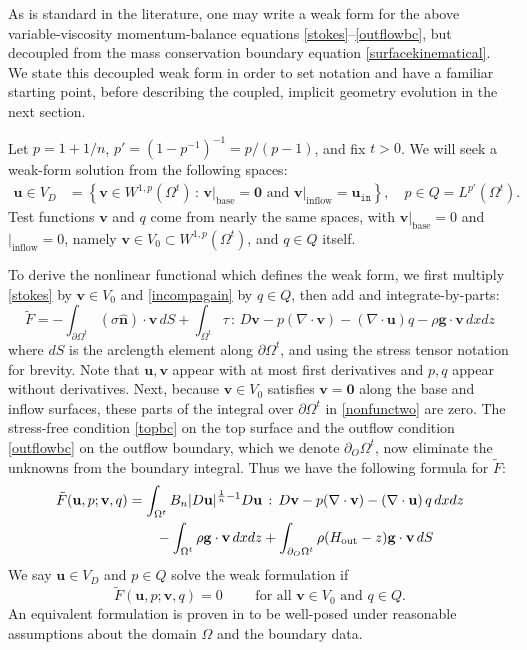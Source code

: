 \documentclass[letterpaper,final,12pt,reqno]{amsart}
\newcommand{\hbn}{\hat{\mathbf{n}}}
\newcommand{\bg}{\mathbf{g}}
\newcommand{\bu}{\mathbf{u}}
\newcommand{\bv}{\mathbf{v}}
\newcommand{\bzero}{\bm{0}}
\begin{document}
As is standard in the literature, one may write a weak form for the above variable-viscosity momentum-balance equations \eqref{stokes}--\eqref{outflowbc}, but decoupled from the mass conservation boundary equation \eqref{surfacekinematical}.  We state this decoupled weak form in order to set notation and have a familiar starting point, before describing the coupled, implicit geometry evolution in the next section.

Let $p=1+1/n$, $p'=(1-p^{-1})^{-1}=p/(p-1)$, and fix $t>0$.  We will seek a weak-form solution from the following spaces:
\begin{align*}
\bu \in V_D &= \left\{\bv \in W^{1,p}(\Omega^t)\,:\,\bv\big|_{\text{base}}=\bzero \text{ and } \bv\big|_{\text{inflow}} = \bu_{\texttt{in}}\right\}, \quad p \in Q =L^{p'}(\Omega^t).
\end{align*}
Test functions $\bv$ and $q$ come from nearly the same spaces, with $\bv\big|_{\text{base}} =0$ and $\big|_{\text{inflow}} = 0$, namely $\bv \in V_0 \subset W^{1,p}(\Omega^t)$, and $q \in Q$ itself.

To derive the nonlinear functional which defines the weak form, we first multiply \eqref{stokes} by $\bv\in V_0$ and \eqref{incompagain} by $q\in Q$, then add and integrate-by-parts:
\begin{equation}
\tilde F = -\int_{\partial\Omega^t} (\sigma \hbn)\cdot \bv\,dS + \int_{\Omega^t} \tau \,:\,D\bv - p (\nabla \cdot \bv) - \left(\nabla \cdot \bu\right) q - \rho \mathbf{g} \cdot \bv \,dx dz \label{nonfunctwo}
\end{equation}
where $dS$ is the arclength element along $\partial\Omega^t$, and using the stress tensor notation for brevity.  Note that $\bu,\bv$ appear with at most first derivatives and $p,q$ appear without derivatives.  Next, because $\bv\in V_0$ satisfies $\bv=\bzero$ along the base and inflow surfaces, these parts of the integral over $\partial\Omega^t$ in \eqref{nonfunctwo} are zero.  The stress-free condition \eqref{topbc} on the top surface and the outflow condition \eqref{outflowbc} on the outflow boundary, which we denote $\partial_O \Omega^t$, now eliminate the unknowns from the boundary integral.  Thus we have the following formula for $\tilde F$:
\begin{align}
\tilde F(\bu,p;\bv,q) &= \int_{\Omega^t} B_n |D\bu|^{\frac{1}{n} - 1} D\bu\,:\,D\bv - p (\nabla \cdot \bv) - \left(\nabla \cdot \bu\right) q \,dx dz \label{definetildeF} \\
    &\qquad  - \int_{\Omega^t} \rho \mathbf{g} \cdot \bv \,dx dz + \int_{\partial_O \Omega^t} \rho (H_{\text{out}}-z) \bg \cdot \bv \,dS \notag
\end{align}
We say $\bu\in V_D$ and $p\in Q$ solve the weak formulation if
\begin{equation}
\tilde F(\bu,p;\bv,q) = 0 \qquad \text{ for all } \bv\in V_0 \text{ and } q\in Q.  \label{weak}
\end{equation}
An equivalent formulation is proven in \cite[Theorem 3.8]{JouvetRappaz2011} to be well-posed under reasonable assumptions about the domain $\Omega$ and the boundary data.
\end{document}
